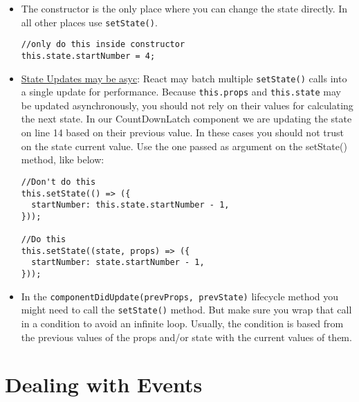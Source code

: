 \documentclass[a4paper, oneside, titlepage, 12pt]{book}
\begin{document}
\begin{itemize}
  \item The constructor is the only place where you can change the state directly. In all other places use \texttt{setState()}.
  \begin{verbatim}
//only do this inside constructor               
this.state.startNumber = 4;
\end{verbatim}
  \item \href{https://reactjs.org/docs/state-and-lifecycle.html}{State Updates may be asyc}: React may batch multiple \texttt{setState()} calls into a single update for performance. Because \texttt{this.props} and \texttt{this.state} may be updated asynchronously, you should not rely on their values for calculating the next state. In our CountDownLatch component we are updating the state on line 14 based on their previous value. In these cases you should not trust on the state current value. Use the one passed as argument on the setState() method, like below:
\begin{verbatim}
//Don't do this
this.setState(() => ({
  startNumber: this.state.startNumber - 1,
}));

//Do this
this.setState((state, props) => ({
  startNumber: state.startNumber - 1,
}));
\end{verbatim}
  \item In the \texttt{componentDidUpdate(prevProps, prevState)} lifecycle method you might need to call the \texttt{setState()} method. But make sure you wrap that call in a condition to avoid an infinite loop. Usually, the condition is based from the previous values of the props and/or state with the current values of them.
\end{itemize}


\section{Dealing with Events}
\end{document}
